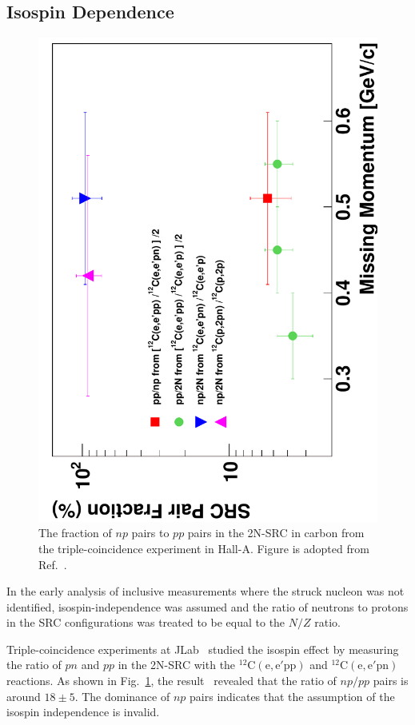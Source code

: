 \subsection{Isospin Dependence}
\begin{figure}[!ht]
  \begin{center}
    \includegraphics[type=pdf,angle=270,ext=.pdf,read=.pdf,width=0.80\linewidth]{./figures/physics/10yrSRC_fig7}
    \caption[The fraction of $np$ pairs to $pp$ pairs in the 2N-SRC]{\footnotesize{The fraction of $np$ pairs to $pp$ pairs in the 2N-SRC in carbon from the triple-coincidence experiment in Hall-A. Figure is adopted from Ref.~\cite{Subedi:2008zz}.}}
    \label{triple_src_np}
  \end{center}
\end{figure} 
  In the early analysis of inclusive measurements where the struck nucleon was not identified,  isospin-independence was assumed and the ratio of neutrons to protons in the SRC configurations was treated to be equal to the $N/Z$ ratio. 

  Triple-coincidence experiments at JLab~\cite{PhysRevLett.90.042301,PhysRevLett.99.072501,Subedi:2008zz} studied the isospin effect by measuring the ratio of $pn$ and $pp$ in the 2N-SRC with the $\mathrm{^{12}C(e,e'pp)}$ and $\mathrm{^{12}C(e,e'pn)}$ reactions. As shown in Fig.~\ref{triple_src_np}, the result~\cite{Subedi:2008zz} revealed that the ratio of $np/pp$ pairs is around $\mathrm{18\pm 5}$. The dominance of $np$ pairs indicates that the assumption of the isospin independence is invalid.  
  
